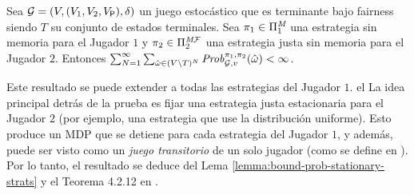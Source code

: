 \begin{lemma}\label{lemma:bound-prob-stationary-strats}
  Sea $\mathcal{G} = (V, (V_1, V_2, V_{\mathsf{P}}), \delta)$ un juego estocástico que es terminante bajo fairness siendo $T$ su conjunto de estados terminales.
  Sea $\pi_{1} \in \Pi^{\textit{M}}_{1}$ una estrategia sin memoria para
  el Jugador $1$ y $\pi_{2} \in \Pi^{\textit{M}\mathcal{F}}_{2}$ una
  estrategia justa sin memoria para el Jugador $2$.  Entonces
  $\sum^\infty_{N=1} \sum_{\hat{\omega} \in (V \setminus T)^{N}} \mathit{Prob}^{\pi_{1}, \pi_{2}}_{\mathcal{G},v}(\hat{\omega}) < \infty$.
\end{lemma}

Este resultado se puede extender a todas las estrategias del Jugador $1$. el
La idea principal detrás de la prueba es fijar una estrategia justa estacionaria para
el Jugador $2$ (por ejemplo, una estrategia que use la distribución uniforme). Esto produce un MDP
que se detiene para cada estrategia del Jugador $1$, y además, puede ser
visto como un \emph{juego transitorio} de un solo jugador (como se define en
\cite{FilarV96}). Por lo tanto, el resultado se deduce del Lema
\ref{lemma:bound-prob-stationary-strats} y el Teorema 4.2.12 en
\cite{FilarV96}.

